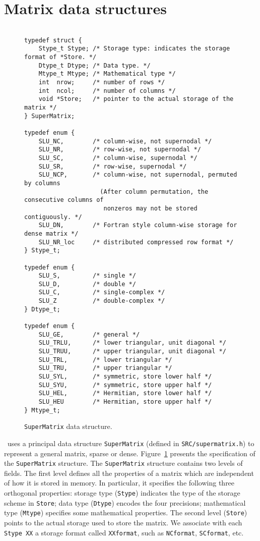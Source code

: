 \section{Matrix data structures}
\label{sec:rep}

\begin{figure}
\begin{verbatim}

typedef struct {
    Stype_t Stype; /* Storage type: indicates the storage format of *Store. */
    Dtype_t Dtype; /* Data type. */
    Mtype_t Mtype; /* Mathematical type */
    int  nrow;     /* number of rows */
    int  ncol;     /* number of columns */
    void *Store;   /* pointer to the actual storage of the matrix */
} SuperMatrix;

typedef enum {
    SLU_NC,        /* column-wise, not supernodal */
    SLU_NR,        /* row-wise, not supernodal */
    SLU_SC,        /* column-wise, supernodal */
    SLU_SR,        /* row-wise, supernodal */
    SLU_NCP,       /* column-wise, not supernodal, permuted by columns
                     (After column permutation, the consecutive columns of 
                      nonzeros may not be stored contiguously. */
    SLU_DN,        /* Fortran style column-wise storage for dense matrix */
    SLU_NR_loc     /* distributed compressed row format */ 
} Stype_t;

typedef enum {
    SLU_S,         /* single */
    SLU_D,         /* double */
    SLU_C,         /* single-complex */
    SLU_Z          /* double-complex */
} Dtype_t;

typedef enum {
    SLU_GE,        /* general */
    SLU_TRLU,      /* lower triangular, unit diagonal */
    SLU_TRUU,      /* upper triangular, unit diagonal */
    SLU_TRL,       /* lower triangular */
    SLU_TRU,       /* upper triangular */
    SLU_SYL,       /* symmetric, store lower half */
    SLU_SYU,       /* symmetric, store upper half */
    SLU_HEL,       /* Hermitian, store lower half */
    SLU_HEU        /* Hermitian, store upper half */
} Mtype_t;

\end{verbatim}
\caption{{\tt SuperMatrix} data structure.}
\label{fig:struct}
\end{figure}

    \SuperLU\ uses a principal data structure {\tt SuperMatrix} (defined in
{\tt SRC/supermatrix.h}) to represent a general matrix, sparse or dense. 
 Figure~\ref{fig:struct} presents the specification of the {\tt SuperMatrix} 
structure.
The {\tt SuperMatrix} structure contains two levels of fields. The
first level defines all the properties of a matrix which are independent
of how it is stored in memory. In particular, it specifies the following 
three orthogonal properties: storage type ({\tt Stype}) indicates the 
type of the storage scheme in {\tt *Store}; data type ({\tt Dtype}) 
encodes the four precisions; 
mathematical type ({\tt Mtype}) specifies some mathematical properties. 
The second level ({\tt *Store}) points to the actual storage
used to store the matrix. We associate with each {\tt Stype XX}
a storage format called {\tt XXformat}, such as {\tt NCformat},
{\tt SCformat}, etc.

